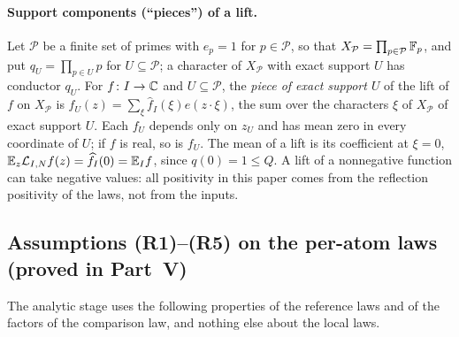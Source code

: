 \paragraph{Support components (``pieces'') of a lift.}
Let $\mathcal P$ be a finite set of primes with $e_p=1$ for $p\in\mathcal P$, so
that $X_{\mathcal P}=\prod_{p\in\mathcal P}\mathbb F_p$, and put $q_U=\prod_{p\in U}p$
for $U\subseteq\mathcal P$; a character of $X_{\mathcal P}$ with exact support
$U$ has conductor $q_U$. For $f\colon I\to\mathbb C$ and $U\subseteq\mathcal P$, the
\emph{piece of exact support $U$} of the lift of $f$ on $X_{\mathcal P}$ is
$f_U(z)=\sum_\xi\widehat f_I(\xi)e(z\cdot\xi)$, the sum over the characters $\xi$
of $X_{\mathcal P}$ of exact support $U$. Each $f_U$
depends only on $z_U$ and has mean zero in every coordinate of $U$; if $f$ is
real, so is $f_U$. The mean of a lift is its coefficient at $\xi=0$,
$\mathbb E_z\mathcal L_{I,N}f(z)=\widehat f_I(0)=\mathbb E_If$, since $q(0)=1\le Q$. A lift of
a nonnegative function can take negative values: all positivity in this paper
comes from the reflection positivity of the laws, not from the inputs.

\subsection{Assumptions (R1)--(R5) on the per-atom laws (proved in Part~V)}\label{subsec:lifts:reference}

The analytic stage uses the following properties of the reference laws and of
the factors of the comparison law, and nothing else about the local laws.

